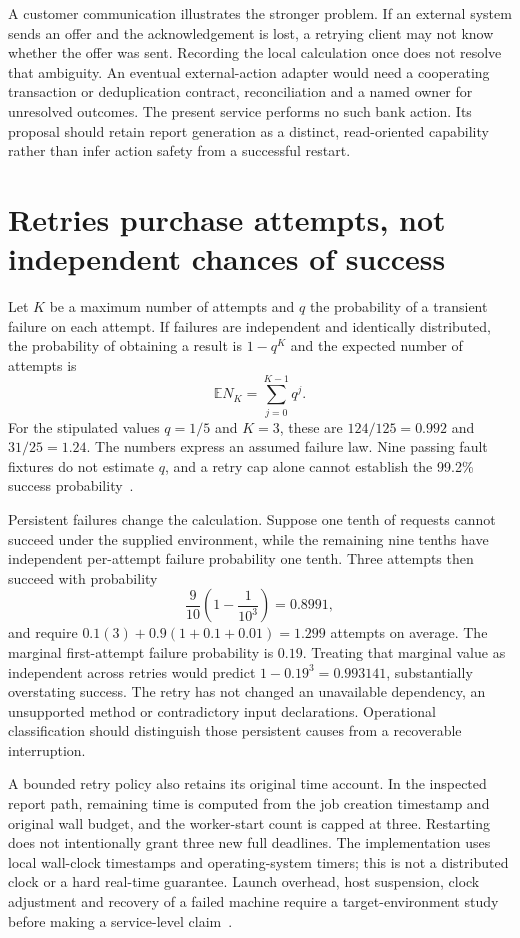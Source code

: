 A customer communication illustrates the stronger problem. If an external
system sends an offer and the acknowledgement is lost, a retrying client may
not know whether the offer was sent. Recording the local calculation once
does not resolve that ambiguity. An eventual external-action adapter would
need a cooperating transaction or deduplication contract, reconciliation and
a named owner for unresolved outcomes. The present service performs no such
bank action. Its proposal should retain report generation as a distinct,
read-oriented capability rather than infer action safety from a successful
restart.

\section{Retries purchase attempts, not independent chances of success}

Let $K$ be a maximum number of attempts and $q$ the probability of a transient
failure on each attempt. If failures are independent and identically
distributed, the probability of obtaining a result is $1-q^K$ and the
expected number of attempts is
\[
 \mathbb E N_K=\sum_{j=0}^{K-1}q^j.
\]
For the stipulated values $q=1/5$ and $K=3$, these are $124/125=0.992$
and $31/25=1.24$. The numbers express an assumed failure law. Nine passing
fault fixtures do not estimate $q$, and a retry cap alone cannot establish
the 99.2\% success probability~\citep{exec13_ops_exact}.

Persistent failures change the calculation. Suppose one tenth of requests
cannot succeed under the supplied environment, while the remaining nine
tenths have independent per-attempt failure probability one tenth. Three
attempts then succeed with probability
\[
 \frac9{10}\left(1-\frac1{10^3}\right)=0.8991,
\]
and require $0.1(3)+0.9(1+0.1+0.01)=1.299$ attempts on average.
The marginal first-attempt failure probability is $0.19$. Treating that
marginal value as independent across retries would predict
$1-0.19^3=0.993141$, substantially overstating success. The retry has not
changed an unavailable dependency, an unsupported method or contradictory
input declarations. Operational classification should distinguish those
persistent causes from a recoverable interruption.

A bounded retry policy also retains its original time account. In the
inspected report path, remaining time is computed from the job creation
timestamp and original wall budget, and the worker-start count is capped at
three. Restarting does not intentionally grant three new full deadlines.
The implementation uses local wall-clock timestamps and operating-system
timers; this is not a distributed clock or a hard real-time guarantee.
Launch overhead, host suspension, clock adjustment and recovery of a failed
machine require a target-environment study before making a service-level
claim~\citep{exec13_ops_source}.

